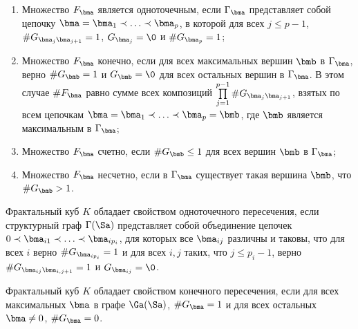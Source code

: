 \begin{theorem}\qquad
\begin{enumerate}[nolistsep]
\item Множество $F_\bma$ является одноточечным, если $\Gamma_\bma$ представляет собой цепочку $\bma=\bma_1\prec\ldots\prec\bma_p$, в которой для всех $j\le p-1$, $\# G_{\bma_j\bma_{j+1}}=1$, $G_{\bma_j}=\0$ и $\#G_{\bma_p}=1$;
\item Множество $F_\bma$ конечно, если для всех максимальных вершин $\bmb$ в $\Gamma_\bma$, верно $\#G_\bmb=1$ и $G_{\bmb}=\0$ для всех остальных вершин в $\Gamma_\bma$.
В этом случае $\#F_\bma$ равно сумме всех композиций $\prod \limits_{j=1}^{p-1}\# G_{\bma_j\bma_{j+1}}$, взятых по всем цепочкам $\bma=\bma_1\prec\ldots\prec\bma_p=\bmb$, где $\bmb$ является максимальным в $\Gamma_\bma$;
\item Множество $F_\bma$ счетно, если $\#G_\bmb\le 1$ для всех вершин $\bmb$ в $\Gamma_\bma$;
\item Множество $F_\bma$ несчетно, если в $\Gamma_\bma$ существует такая вершина $\bmb$, что $\#G_\bmb> 1$.
\end{enumerate}
\end{theorem}

\begin{corollary}
Фрактальный куб $K$ обладает свойством одноточечного пересечения, если структурный граф $\Gamma(\Sa)$ представляет собой объединение цепочек $0\prec\bma_{i1}\prec\ldots\prec\bma_{ip_i}$, для которых все $\bma_{ij}$ различны и таковы, что для всех $i$ верно $\#G_{\bma_{ip_i}}=1$ и для всех $i,j$ таких, что $j\le p_i-1$, верно $\# G_{\bma_{ij}\bma_{i,j+1}}=1$ и $G_{\bma_{ij}}=\0$.

Фрактальный куб $K$ обладает свойством конечного пересечения, если для всех максимальных $\bma$ в графе $\Ga (\Sa)$, $\#G_\bma=1$ и для всех остальных $\bma\neq 0$, $\#G_\bma=0$.
\end{corollary}

